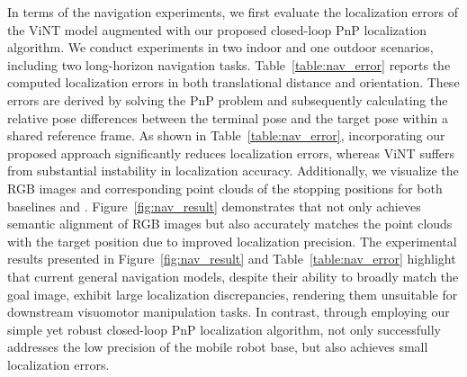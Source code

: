 In terms of the navigation experiments, we first evaluate the localization errors of the ViNT model augmented with our proposed closed-loop PnP localization algorithm. We conduct experiments in two indoor and one outdoor scenarios, including two long-horizon navigation tasks. Table~\ref{table:nav_error} reports the computed localization errors in both translational distance and orientation. These errors are derived by solving the PnP problem and subsequently calculating the relative pose differences between the terminal pose and the target pose within a shared reference frame. As shown in Table~\ref{table:nav_error}, incorporating our proposed approach significantly reduces localization errors, whereas ViNT suffers from substantial instability in localization accuracy. Additionally, we visualize the RGB images and corresponding point clouds of the stopping positions for both baselines and \ourshort. Figure~\ref{fig:nav_result} demonstrates that \ourshort not only achieves semantic alignment of RGB images but also accurately matches the point clouds with the target position due to improved localization precision. The experimental results presented in Figure~\ref{fig:nav_result} and Table~\ref{table:nav_error} highlight that current general navigation models, despite their ability to broadly match the goal image, exhibit large localization discrepancies, rendering them unsuitable for downstream visuomotor manipulation tasks. In contrast, through employing our simple yet robust closed-loop PnP localization algorithm, \ourshort not only successfully addresses the low precision of the mobile robot base, but also achieves small localization errors.


\begin{table}[ht]
\centering
\caption{The results of navigation localization error.}
\label{table:nav_error}

\end{table}





